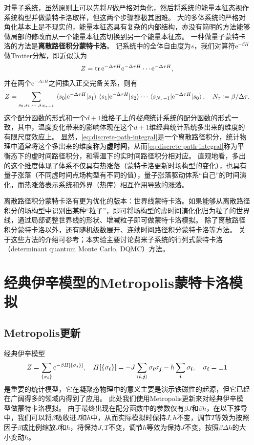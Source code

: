 \documentclass[UTF8]{ctexart}
\newcommand*{\ee}{\mathrm{e}}
\newcommand*{\pair}[1]{\langle #1 \rangle}
\newcommand*{\concept}[1]{{\textbf{#1}}}
\begin{document}
对量子系统，虽然原则上可以先将$H$做严格对角化，然后将系统的能量本征态视作系统构型并做蒙特卡洛取样，但这两个步骤都极其困难。
大的多体系统的严格对角化基本上是不现实的，能量本征态具有复杂的内部结构，亦没有简明的方法能够做局部的修改而从一个能量本征态切换到另一个能量本征态。
一种做量子蒙特卡洛的方法是\concept{离散路径积分蒙特卡洛}。
记系统中的全体自由度为$s$，我们对算符$\ee^{- \beta H}$做Trotter分解，即近似认为
\[
    Z = \trace \ee^{- \Delta \tau H} \ee^{- \Delta \tau H} \cdots \ee^{- \Delta \tau H},
\] 
并在两个$\ee^{- \Delta \tau H}$之间插入正交完备关系，则有
\begin{equation}
    Z = \sum_{s_0, s_1, \cdots, s_{N_\tau - 1}} \mel{s_0}{\ee^{- \Delta \tau H}}{s_1} \mel{s_1}{\ee^{- \Delta \tau H}}{s_2} \cdots \mel{s_{N_\tau - 1}}{\ee^{- \Delta \tau H}}{s_0}, \quad N_\tau \coloneqq \beta / \Delta \tau.
    \label{eq:discrete-path-integral}
\end{equation}
这个配分函数的形式和一个$d+1$维格子上的\emph{经典}统计系统的配分函数的形式一致，其中，温度变化带来的影响体现在这个$d+1$维经典统计系统多出来的维度的有限尺度效应上。
显然，\eqref{eq:discrete-path-integral}是一个离散路径积分，统计物理中通常将这个多出来的维度称为\concept{虚时间}，从而\eqref{eq:discrete-path-integral}称为平衡态下的虚时间路径积分，和零温下的实时间路径积分相对应。
直观地看，多出的这个维度体现了体系不仅具有热涨落（蒙特卡洛更新时场构型的变化），也具有量子涨落（不同虚时间点场构型有不同的值），量子涨落驱动体系“自己”的时间演化，而热涨落表示系统和外界（热库）相互作用导致的涨落。

离散路径积分蒙特卡洛有更为优化的版本：世界线蒙特卡洛。如果能够从离散路径积分的场构型中识别出某种“粒子”，即可将场构型的虚时间演化化归为粒子的世界线，通过局部调整世界线的形状、增减粒子即可做蒙特卡洛模拟。
除了离散路径积分蒙特卡洛以外，还有随机级数展开、连续时间路径积分蒙特卡洛等方法。
关于这些方法的介绍可参考\cite{assaad2008world}；本实验主要讨论费米子系统的行列式蒙特卡洛（determinant quantum Monte Carlo, DQMC）方法。

\section{经典伊辛模型的Metropolis蒙特卡洛模拟}

\subsection{Metropolis更新}

经典伊辛模型
\begin{equation}
    Z = \sum_{\{\sigma_{\vb*{i}}\}} \ee^{- \beta H[\{\sigma_{\vb*{i}}\}]}, \quad H[\{\sigma_{\vb*{i}}\}] = - J \sum_{\pair{\vb*{i}, \vb*{j}}} \sigma_{\vb*{i}} \sigma_{\vb*{j}} - h \sum_{\vb*{i}} \sigma_{\vb*{i}}, \quad \sigma_{\vb*{i}} = \pm 1
\end{equation}
是重要的统计模型，它在凝聚态物理中的意义主要是演示铁磁性的起源，但它已经在广阔得多的领域内得到了应用。
此处我们使用Metropolis更新来对经典伊辛模型做蒙特卡洛模拟。
由于最终出现在配分函数中的参数仅有$\beta J$和$\beta h$，在以下推导中，我们可以将$\beta$吸收进$J$和$h$中，从而实际模拟时保持$J, h$不变，调节$T$等效为按照因子$\beta$成比例缩放$J$和$h$，将保持$J, T$不变，调节$h$等效为保持$J$不变，按照$\beta \Delta h$的大小变动$h$。
\end{document}
